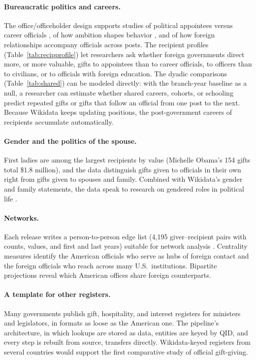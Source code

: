 \documentclass[11pt]{article}
\begin{document}
\paragraph{Bureaucratic politics and careers.} The office/officeholder design supports studies of political appointees versus career officials \citep{lewis2008politics}, of how ambition shapes behavior \citep{teodoro2011bureaucratic}, and of how foreign relationships accompany officials across posts. The recipient profiles (Table~\ref{tab:recipprofile}) let researchers ask whether foreign governments direct more, or more valuable, gifts to appointees than to career officials, to officers than to civilians, or to officials with foreign education. The dyadic comparisons (Table~\ref{tab:shared}) can be modeled directly: with the branch-year baseline as a null, a researcher can estimate whether shared careers, cohorts, or schooling predict repeated gifts or gifts that follow an official from one post to the next. Because Wikidata keeps updating positions, the post-government careers of recipients accumulate automatically.

\paragraph{Gender and the politics of the spouse.} First ladies are among the largest recipients by value (Michelle Obama's 154 gifts total \$1.8 million), and the data distinguish gifts given to officials in their own right from gifts given to spouses and family. Combined with Wikidata's gender and family statements, the data speak to research on gendered roles in political life \citep{teele2018ties}.

\paragraph{Networks.} Each release writes a person-to-person edge list (4,195 giver--recipient pairs with counts, values, and first and last years) suitable for network analysis \citep{hafner2009network,ward2011network}. Centrality measures identify the American officials who serve as hubs of foreign contact and the foreign officials who reach across many U.S.\ institutions. Bipartite projections reveal which American offices share foreign counterparts.

\paragraph{A template for other registers.} Many governments publish gift, hospitality, and interest registers for ministers and legislators, in formats as loose as the American one. The pipeline's architecture, in which lookups are stored as data, entities are keyed by QID, and every step is rebuilt from source, transfers directly. Wikidata-keyed registers from several countries would support the first comparative study of official gift-giving.
\end{document}
